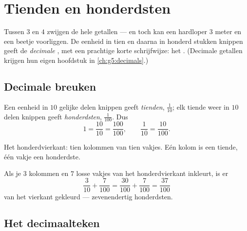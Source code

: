 \chapter{Tienden en honderdsten}\label{ch:g4:decimals}

Tussen $3$ en $4$ zwijgen de hele getallen --- en toch kan een hardloper
$3$ meter en een beetje voorliggen. De eenheid in tien en daarna in
honderd stukken knippen geeft de \emph{decimale }, met een
prachtige korte schrijfwijze: het . (Decimale getallen krijgen
hun eigen hoofdstuk in \cref{ch:g5:decimals}.)

\section{Decimale breuken}

\begin{definition}\label{def:g4:decimals:def}
Een eenheid in $10$ gelijke delen knippen geeft \emph{tienden},
$\frac{1}{10}$; elk tiende weer in $10$ delen knippen geeft
\emph{honderdsten}, $\frac{1}{100}$. Dus
\[
1 = \frac{10}{10} = \frac{100}{100},
\qquad
\frac{1}{10} = \frac{10}{100}.
\]
\end{definition}

\begin{omfigure}

{\small Het honderdvierkant: tien kolommen van tien vakjes. Eén kolom is
een tiende, één vakje een honderdste.}
\end{omfigure}

\begin{example}\label{ex:g4:decimals:count}
Als je $3$ kolommen en $7$ losse vakjes van het honderdvierkant inkleurt,
is er
\[
\frac{3}{10} + \frac{7}{100} = \frac{30}{100} + \frac{7}{100}
= \frac{37}{100}
\]
van het vierkant gekleurd --- zevenendertig honderdsten.
\end{example}

\section{Het decimaalteken}

